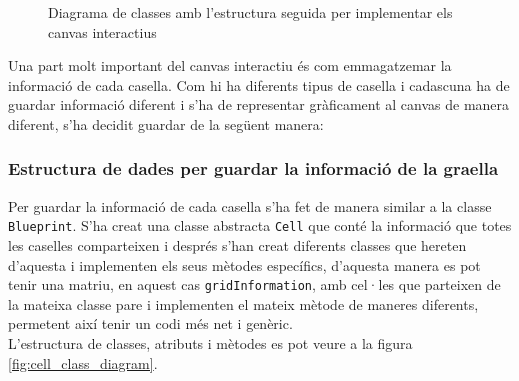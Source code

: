 \begin{figure}[H]
{
    }
    \caption{Diagrama de classes amb l'estructura seguida per implementar els canvas interactius}
    \label{fig:blueprint_class_diagram}
\end{figure}


Una part molt important del canvas interactiu és com emmagatzemar la informació de cada casella. Com hi ha diferents tipus de casella i cadascuna ha de guardar informació diferent i s'ha de representar gràficament al canvas de manera diferent, s'ha decidit guardar de la següent manera:

\subsubsection{Estructura de dades per guardar la informació de la graella}
Per guardar la informació de cada casella s'ha fet de manera similar a la classe \lstinline{Blueprint}. S'ha creat una classe abstracta \lstinline{Cell} que conté la informació que totes les caselles comparteixen i després s'han creat diferents classes que hereten d'aquesta i implementen els seus mètodes específics, d'aquesta manera es pot tenir una matriu, en aquest cas \lstinline{gridInformation}, amb cel·les que parteixen de la mateixa classe pare i implementen el mateix mètode de maneres diferents, permetent així tenir un codi més net i genèric.\\
L'estructura de classes, atributs i mètodes es pot veure a la figura \ref{fig:cell_class_diagram}.


